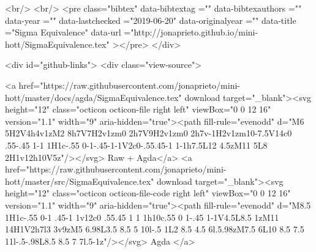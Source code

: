   <br/>
  <br/>
  <pre class="bibtex"
       data-bibtextag =""
       data-bibtexauthors =""
       data-year =""
       data-lastchecked ="2019-06-20"
       data-originalyear =""
       data-title ="Sigma Equivalence"
       data-url ="http://jonaprieto.github.io/mini-hott/SigmaEquivalence.tex"
  ></pre>
  </div>
  

  <div id="github-links">
    <div class="view-source">
      
        <a href="https://raw.githubusercontent.com/jonaprieto/mini-hott/master/docs/agda/SigmaEquivalence.tex" download target="_blank"><svg height="12" class="octicon octicon-file right left" viewBox="0 0 12 16" version="1.1" width="9" aria-hidden="true"><path fill-rule="evenodd" d="M6 5H2V4h4v1zM2 8h7V7H2v1zm0 2h7V9H2v1zm0 2h7v-1H2v1zm10-7.5V14c0 .55-.45 1-1 1H1c-.55 0-1-.45-1-1V2c0-.55.45-1 1-1h7.5L12 4.5zM11 5L8 2H1v12h10V5z"/></svg> Raw + Agda</a>
        <a href="https://raw.githubusercontent.com/jonaprieto/mini-hott/master/src/SigmaEquivalence.tex" download target="_blank"><svg height="12" class="octicon octicon-file-code right left" viewBox="0 0 12 16" version="1.1" width="9" aria-hidden="true"><path fill-rule="evenodd" d="M8.5 1H1c-.55 0-1 .45-1 1v12c0 .55.45 1 1 1h10c.55 0 1-.45 1-1V4.5L8.5 1zM11 14H1V2h7l3 3v9zM5 6.98L3.5 8.5 5 10l-.5 1L2 8.5 4.5 6l.5.98zM7.5 6L10 8.5 7.5 11l-.5-.98L8.5 8.5 7 7l.5-1z"/></svg> Agda </a>
      

